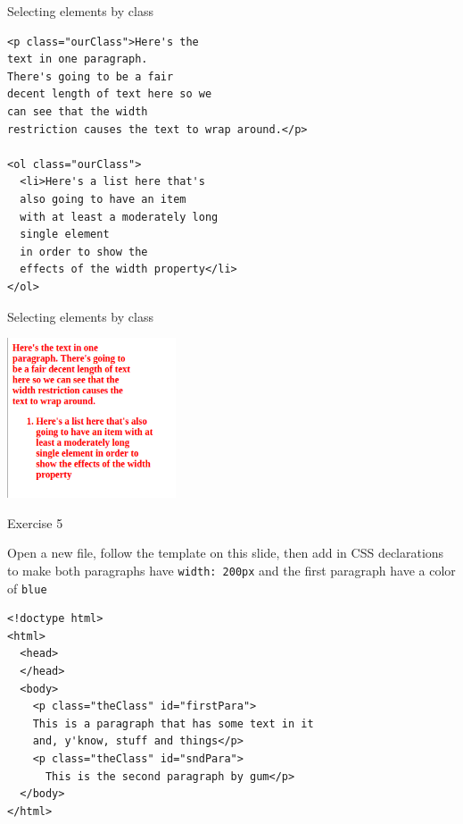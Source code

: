 \documentclass{beamer}
\begin{document}
\begin{frame}[fragile]{Selecting elements by class}
 \begin{block}{}
\begin{verbatim}
<p class="ourClass">Here's the 
text in one paragraph. 
There's going to be a fair 
decent length of text here so we 
can see that the width 
restriction causes the text to wrap around.</p>

<ol class="ourClass">
  <li>Here's a list here that's 
  also going to have an item 
  with at least a moderately long 
  single element 
  in order to show the 
  effects of the width property</li>
</ol>
\end{verbatim}
\end{block}
\end{frame}

\begin{frame}{Selecting elements by class}
\begin{block}{}
\includegraphics[width=5cm]{byClass.png}
\end{block}
\end{frame}

\begin{frame}[fragile,label={sec:orgheadline34}]{Exercise 5}
 \begin{block}{}
{\Large
Open a new file, follow the template on this slide, then add in CSS declarations to make both paragraphs have \texttt{width: 200px} and the first paragraph have a color of \texttt{blue}
}
\end{block}
\begin{block}{}
\begin{verbatim}
<!doctype html>
<html>
  <head>
  </head>
  <body>
    <p class="theClass" id="firstPara">
    This is a paragraph that has some text in it 
    and, y'know, stuff and things</p>
    <p class="theClass" id="sndPara">
      This is the second paragraph by gum</p>
  </body>
</html>
\end{verbatim}
\end{block}
\end{frame}
\end{document}
